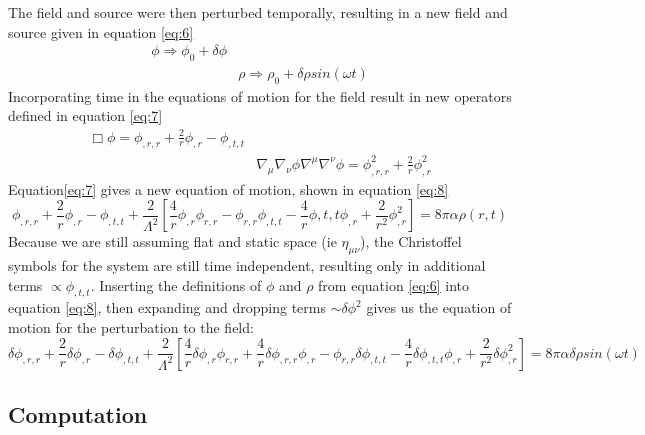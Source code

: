 \documentclass[12pt,a4paper]{article} %
\begin{document}
The field and source were then perturbed temporally, resulting in a new field and source given in equation \ref{eq:6}
\begin{equation}\label{eq:6}
\begin{split}
\phi \Rightarrow \phi_0 + \delta\phi \\
&\rho \Rightarrow \rho_0 + \delta \rho sin(\omega t)
\end{split}
\end{equation}
Incorporating time in the equations of motion for the field result in new operators defined in equation \ref{eq:7}
\begin{equation}\label{eq:7}
\begin{split}
\Box \phi = \phi_{,r,r} + \frac{2}{r}\phi_{,r} - \phi_{,t,t} \\
& \nabla_{\mu}\nabla_{\nu}\phi\nabla^{\mu}\nabla^{\nu}\phi = \phi_{,r,r}^2 + \frac{2}{r} \phi_{,r}^2
\end{split}
\end{equation}
Equation\ref{eq:7} gives a new equation of motion, shown in equation \ref{eq:8}
\begin{equation}\label{eq:8}
\phi_{,r,r} + \frac{2}{r} \phi_{,r} -\phi_{,t,t}+ \frac{2}{\Lambda^2 }[\frac{4}{r}\phi_{,r}\phi_{r,r} - \phi_{r,r}\phi_{,t,t}-\frac{4}{r}\phi{,t,t}\phi_{,r} + \frac{2}{r^2}\phi_{,r}^2] = 8 \pi \alpha \rho(r,t)
\end{equation}
Because we are still assuming flat and static space (ie $\eta_{\mu \nu}$), the Christoffel symbols for the system are still time independent, resulting only in additional terms $\propto \phi_{,t,t}$. Inserting the definitions of $\phi$ and $\rho$ from equation \ref{eq:6} into equation \ref{eq:8}, then expanding and dropping terms $\sim \delta \phi^2$ gives us the equation of motion for the perturbation to the field:
\begin{equation}\label{eq:9}
\delta\phi_{,r,r} + \frac{2}{r} \delta\phi_{,r} -\delta\phi_{,t,t}+ \frac{2}{\Lambda^2 }[\frac{4}{r}\delta\phi_{,r}\phi_{r,r} +\frac{4}{r}\delta\phi_{,r,r}\phi_{,r}-\phi_{r,r}\delta\phi_{,t,t}-\frac{4}{r}\delta\phi_{,t,t}\phi_{,r} + \frac{2}{r^2}\delta\phi_{,r}^2] = 8 \pi \alpha \delta\rho sin(\omega t)
\end{equation}

\subsection{Computation}

\end{document}
